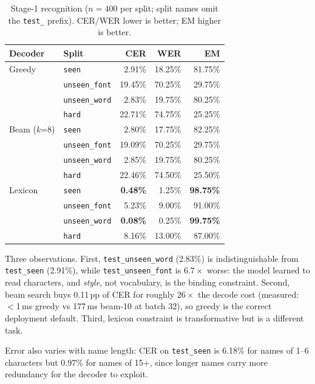 \documentclass[conference]{IEEEtran}
\begin{document}
\begin{table}[t]
\caption{Stage-1 recognition ($n=400$ per split; split names omit the
\texttt{test\_} prefix). CER/WER lower is better; EM higher is better.}
\label{tab:stage1}
\centering
\footnotesize
\begin{tabular}{@{}llrrr@{}}
\toprule
Decoder & Split & CER & WER & EM \\
\midrule
\multirow{1}{*}{Greedy}
 & \texttt{seen}        & 2.91\%  & 18.25\% & 81.75\% \\
 & \texttt{unseen\_font} & 19.45\% & 70.25\% & 29.75\% \\
 & \texttt{unseen\_word} & 2.83\%  & 19.75\% & 80.25\% \\
 & \texttt{hard}        & 22.71\% & 74.75\% & 25.25\% \\
\midrule
Beam ($k$=8)
 & \texttt{seen}        & 2.80\%  & 17.75\% & 82.25\% \\
 & \texttt{unseen\_font} & 19.09\% & 70.25\% & 29.75\% \\
 & \texttt{unseen\_word} & 2.85\%  & 19.75\% & 80.25\% \\
 & \texttt{hard}        & 22.46\% & 74.50\% & 25.50\% \\
\midrule
Lexicon
 & \texttt{seen}        & \textbf{0.48\%} & 1.25\%  & \textbf{98.75\%} \\
 & \texttt{unseen\_font} & 5.23\%  & 9.00\%  & 91.00\% \\
 & \texttt{unseen\_word} & \textbf{0.08\%} & 0.25\%  & \textbf{99.75\%} \\
 & \texttt{hard}        & 8.16\%  & 13.00\% & 87.00\% \\
\bottomrule
\end{tabular}
\end{table}

Three observations. First, \texttt{test\_unseen\_word} (2.83\%) is
indistinguishable from \texttt{test\_seen} (2.91\%), while
\texttt{test\_unseen\_font} is $6.7\times$ worse: the model learned to read
characters, and \emph{style}, not vocabulary, is the binding constraint.
Second, beam search buys 0.11\,pp of CER for roughly $26\times$ the decode cost
(measured: $<$1\,ms greedy vs 177\,ms beam-10 at batch 32), so greedy is the
correct deployment default. Third, lexicon constraint is transformative but is a
different task.

Error also varies with name length: CER on \texttt{test\_seen} is 6.18\% for
names of 1--6 characters but 0.97\% for names of 15+, since longer names carry
more redundancy for the decoder to exploit.
\end{document}
